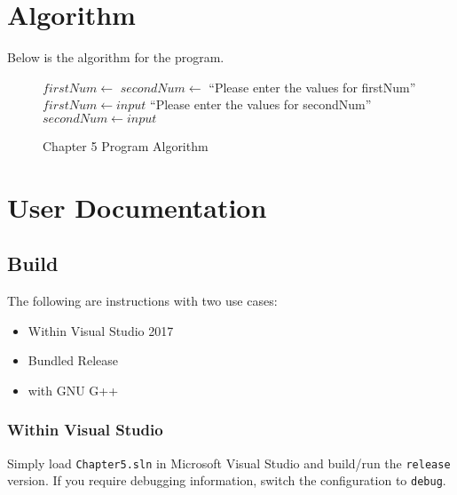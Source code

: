 \documentclass[a4paper,11pt]{article}
\begin{document}
  \newpage
  \section{Algorithm}
    Below is the algorithm for the program.
    \begin{figure}[h]
      \caption{Chapter 5 Program Algorithm}
      \vspace{12pt}
      \begin{algorithmic}
        \State {}
        \State 
        \State $firstNum\gets $
        \State $secondNum\gets $
        \State {}
        \State {} ``Please enter the values for firstNum''
          \State $firstNum\gets input$
        \State {} ``Please enter the values for secondNum''
          \State $secondNum\gets input$
      \end{algorithmic}
      \label{alg:c5}
    \end{figure}


  \newpage
  \section{User Documentation}

    \subsection{Build}
      The following are instructions with two use cases:
      \begin{itemize}
        \item Within Visual Studio 2017
        \item Bundled Release
        \item with GNU G++
      \end{itemize}
      \subsubsection{Within Visual Studio}
        Simply load \texttt{Chapter5.sln} in Microsoft Visual Studio and 
          build/run the \texttt{release} version. If you require debugging
          information, switch the configuration to \texttt{debug}.
\end{document}
